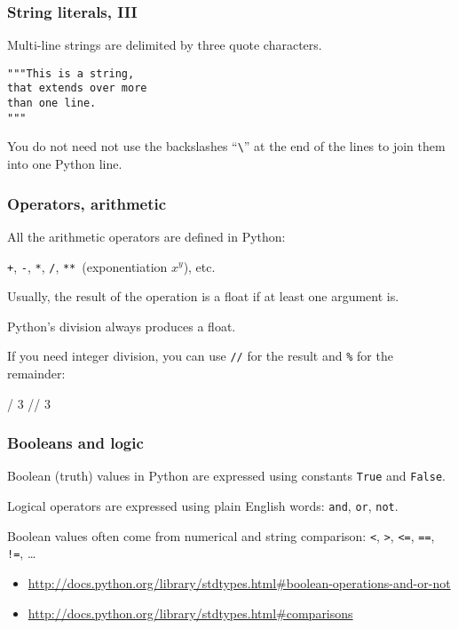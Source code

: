 \documentclass[english,serif,mathserif,xcolor=pdftex,dvipsnames,table]{beamer}
\begin{document}
\begin{frame}[fragile]
  \frametitle{String literals, III}
  Multi-line strings are delimited by three quote characters.
\begin{lstlisting}[showstringspaces=false]
"""This is a string,
that extends over more
than one line.
"""
\end{lstlisting}

  You do not need not use the backslashes
  ``\texttt{\textbackslash}'' at the end of the lines
  to join them into one Python line.
\end{frame}


\begin{frame}[fragile]
  \frametitle{Operators, arithmetic}
  All the arithmetic operators are
  defined in Python:
  
  \texttt{+}, \texttt{-}, \texttt{*}, \texttt{/}, \texttt{**}~(exponentiation $x^y$), etc.

  \+
  Usually, the result of the operation is a float if at least one argument is.

  \+
  Python's division always produces a float.

  If you need integer division, you can use \texttt{//} for the result
  and \texttt{\%} for the remainder:

{
\smaller
\begin{semiverbatim}
 / 3
 // 3
\end{semiverbatim}
}
\end{frame}

\begin{frame}[fragile]
  \frametitle{Booleans and logic}

  Boolean (truth) values in Python are expressed using constants
  \texttt{True} and \texttt{False}.

  \+
  Logical operators are expressed using plain English words:
  \texttt{and}, \texttt{or}, \texttt{not}.

  \+
  Boolean values often come from numerical and string comparison:
  \texttt{<}, \texttt{>}, \texttt{<=}, \texttt{==}, \texttt{!=},
  \ldots

  \begin{references}
    \tiny
    \begin{itemize}
    \item
      \url{http://docs.python.org/library/stdtypes.html#boolean-operations-and-or-not}
    \item
      \url{http://docs.python.org/library/stdtypes.html#comparisons}
    \end{itemize}
  \end{references}
\end{frame}
\end{document}
